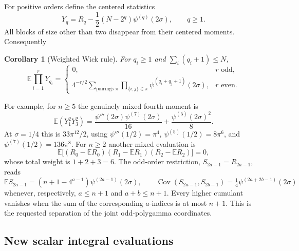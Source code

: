 \documentclass[11pt,a4paper]{article}
\numberwithin{equation}{section}
\newtheorem{corollary}[theorem]{Corollary}
\theoremstyle{definition}
\theoremstyle{remark}
\begin{document}
For positive orders define the centered statistics
\[
 Y_q=R_q-\frac12(N-2^q)\psi^{(q)}(2\sigma),\qquad q\ge1.
\]
All blocks of size other than two disappear from their centered moments.
Consequently
\begin{corollary}[Weighted Wick rule]
\label{gc:wick}
For $q_i\ge1$ and $\sum_i(q_i+1)\le N$,
\begin{equation}\label{gc:wickeq}
 \mathbb E\prod_{i=1}^rY_{q_i}
 =\begin{cases}
 0,&r\text{ odd},\\[2pt]
 \displaystyle 4^{-r/2}\sum_{\text{pairings }\pi}
         \prod_{\{i,j\}\in\pi}\psi^{(q_i+q_j+1)}(2\sigma),
                                    &r\text{ even}.
 \end{cases}
\end{equation}
\end{corollary}
For example, for $n\ge5$ the genuinely mixed fourth moment is
\begin{equation}\label{gc:example13}
 \mathbb E(Y_1^2Y_3^2)
 =\frac{\psi'''(2\sigma)\psi^{(7)}(2\sigma)}{16}
                +\frac{\psi^{(5)}(2\sigma)^2}{8}.
\end{equation}
At $\sigma=1/4$ this is $33\pi^{12}/2$, using
$\psi'''(1/2)=\pi^4$, $\psi^{(5)}(1/2)=8\pi^6$, and
$\psi^{(7)}(1/2)=136\pi^8$.
For $n\ge2$ another mixed evaluation is
\begin{equation}\label{gc:example012}
 \mathbb E\bigl[(R_0-\mathbb ER_0)(R_1-\mathbb ER_1)
                                  (R_2-\mathbb ER_2)\bigr]=0,
\end{equation}
whose total weight is $1+2+3=6$.
The odd-order restriction, $S_{2a-1}=R_{2a-1}$, reads
\[
 \mathbb ES_{2a-1}=(n+1-4^{a-1})\psi^{(2a-1)}(2\sigma),\qquad
 \operatorname{Cov}(S_{2a-1},S_{2b-1})
               =\tfrac14\psi^{(2a+2b-1)}(2\sigma)
\]
whenever, respectively, $a\le n+1$ and $a+b\le n+1$.
Every higher cumulant vanishes when the sum of the corresponding
$a$-indices is at most $n+1$. This is the requested separation of the
joint odd-polygamma coordinates.

\subsection{New scalar integral evaluations}
\end{document}
